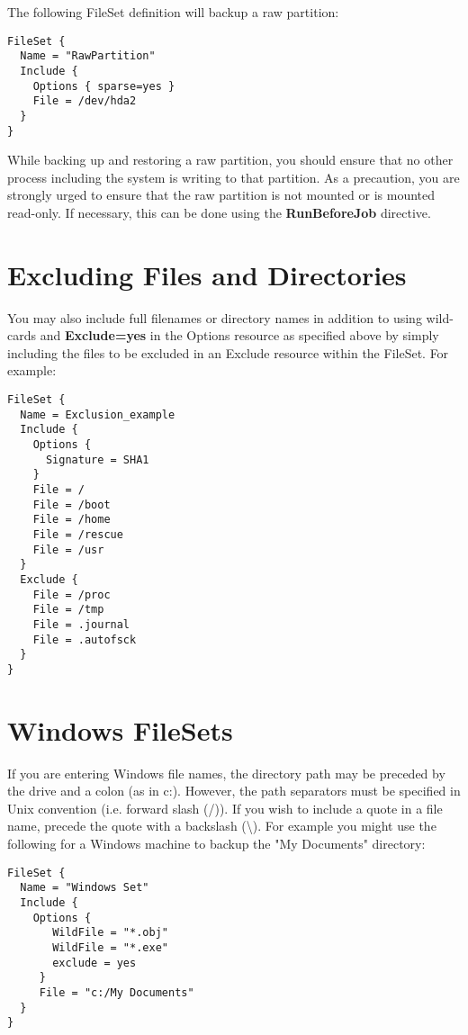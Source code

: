 The following FileSet definition will backup a raw partition: 

\footnotesize
\begin{verbatim}
FileSet {
  Name = "RawPartition"
  Include {
    Options { sparse=yes }
    File = /dev/hda2
  }
}
\end{verbatim}
\normalsize

While backing up and restoring a raw partition, you should ensure that no
other process including the system is writing to that partition. As a
precaution, you are strongly urged to ensure that the raw partition is not
mounted or is mounted read-only. If necessary, this can be done using the {\bf
RunBeforeJob} directive. 


\section{Excluding Files and Directories}

You may also include full filenames or directory names in addition to using
wild-cards and {\bf Exclude=yes} in the Options resource as specified above by
simply including the files to be excluded in an Exclude resource within the
FileSet. For example: 

\footnotesize
\begin{verbatim}
FileSet {
  Name = Exclusion_example
  Include {
    Options {
      Signature = SHA1
    }
    File = /
    File = /boot
    File = /home
    File = /rescue
    File = /usr
  }
  Exclude {
    File = /proc
    File = /tmp
    File = .journal
    File = .autofsck
  }
}
\end{verbatim}
\normalsize

\label{win32}
\section{Windows FileSets}
If you are entering Windows file names, the directory path may be preceded by
the drive and a colon (as in c:). However, the path separators must be
specified in Unix convention (i.e. forward slash (/)). If you wish to include
a quote in a file name, precede the quote with a backslash
(\textbackslash{}). For example you might use the following
for a Windows machine to backup the "My Documents" directory: 

\footnotesize
\begin{verbatim}
FileSet {
  Name = "Windows Set"
  Include {
    Options {
       WildFile = "*.obj"
       WildFile = "*.exe"
       exclude = yes
     }
     File = "c:/My Documents"
  }
}
\end{verbatim}
\normalsize

